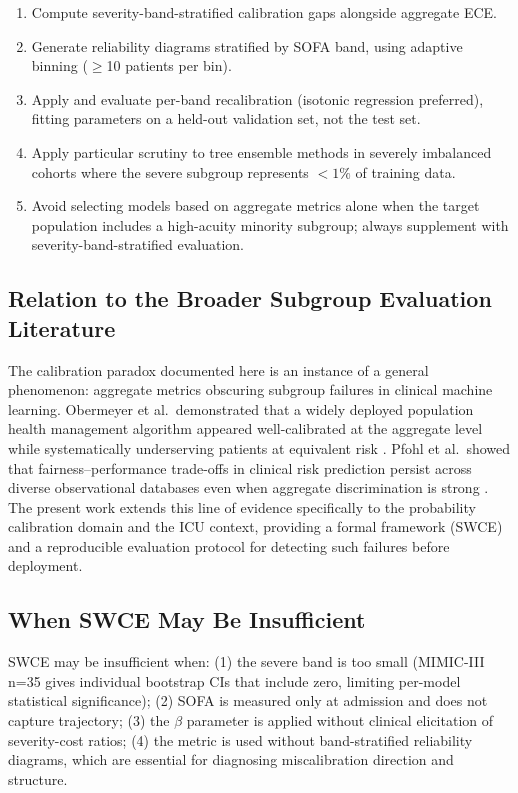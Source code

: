 \documentclass{ieeeaccess}
\begin{document}
\begin{enumerate}
  \item Compute severity-band-stratified calibration gaps alongside aggregate ECE.
  \item Generate reliability diagrams stratified by SOFA band, using adaptive binning ($\ge$10 patients per bin).
  \item Apply and evaluate per-band recalibration (isotonic regression preferred), fitting parameters on a held-out validation set, not the test set.
  \item Apply particular scrutiny to tree ensemble methods in severely imbalanced cohorts where the severe subgroup represents $<1\%$ of training data.
  \item Avoid selecting models based on aggregate metrics alone when the target population includes a high-acuity minority subgroup; always supplement with severity-band-stratified evaluation.
\end{enumerate}

\subsection{Relation to the Broader Subgroup Evaluation Literature}

The calibration paradox documented here is an instance of a general phenomenon: aggregate metrics obscuring subgroup failures in clinical machine learning. Obermeyer et al.\ demonstrated that a widely deployed population health management algorithm appeared well-calibrated at the aggregate level while systematically underserving patients at equivalent risk \cite{b28}. Pfohl et al.\ showed that fairness--performance trade-offs in clinical risk prediction persist across diverse observational databases even when aggregate discrimination is strong \cite{b30}. The present work extends this line of evidence specifically to the probability calibration domain and the ICU context, providing a formal framework (SWCE) and a reproducible evaluation protocol for detecting such failures before deployment.

\subsection{When SWCE May Be Insufficient}

SWCE may be insufficient when: (1) the severe band is too small (MIMIC-III n=35 gives individual bootstrap CIs that include zero, limiting per-model statistical significance); (2) SOFA is measured only at admission and does not capture trajectory; (3) the $\beta$ parameter is applied without clinical elicitation of severity-cost ratios; (4) the metric is used without band-stratified reliability diagrams, which are essential for diagnosing miscalibration direction and structure.
\end{document}
